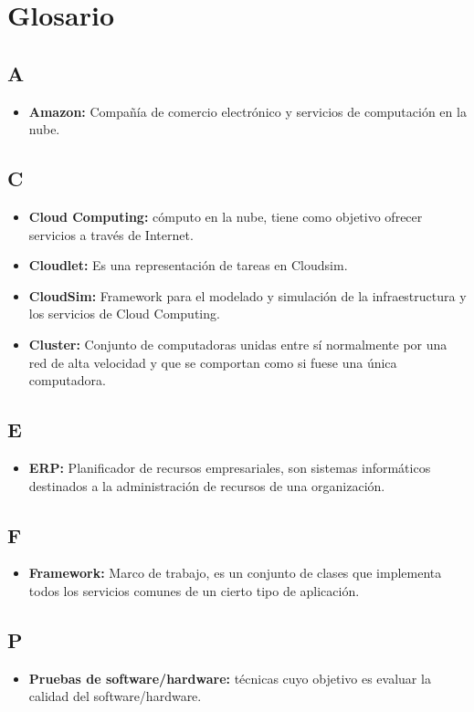 \chead{}
\rhead{\thepage}

\chapter*{Glosario}
\section*{A}
\begin{itemize}
	\item \textbf{Amazon:} Compañ\'ia de comercio electr\'onico y servicios de computaci\'on en la nube.
	
\end{itemize}

\section*{C}

\begin{itemize}
	\item \textbf{Cloud Computing:} c\'omputo en la nube, tiene como objetivo ofrecer servicios a trav\'es de Internet.
	\item \textbf{Cloudlet:} Es una representaci\'on de tareas en Cloudsim.
	\item \textbf{CloudSim:} Framework para el modelado y simulaci\'on de la infraestructura y los servicios de Cloud Computing.
	\item \textbf{Cluster:} Conjunto de computadoras unidas entre s\'i normalmente por una red de alta velocidad y que se comportan como si fuese una \'unica computadora.
	
		
	
\end{itemize}
\section*{E}
\begin{itemize}
	\item \textbf{ERP:} Planificador de recursos empresariales, son sistemas inform\'aticos destinados a la administraci\'on de recursos de una organizaci\'on.
	
	
\end{itemize}


\section*{F}
\begin{itemize}
	\item \textbf{Framework:} Marco de trabajo, es un conjunto de clases que implementa todos los servicios comunes de un cierto tipo de aplicaci\'on.
\end{itemize}


\section*{P}
\begin{itemize}
	\item \textbf{Pruebas de software/hardware:} t\'ecnicas cuyo objetivo es evaluar la calidad del software/hardware.

\end{itemize}




